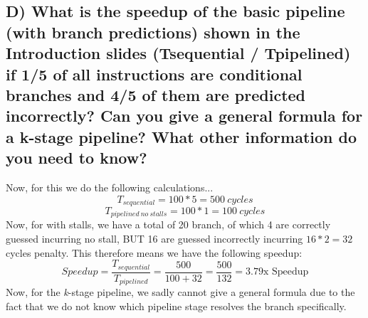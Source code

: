 \documentclass{article}
\begin{document}
\subsection{D) What is the speedup of the basic pipeline (with branch predictions) shown in the Introduction slides (Tsequential / Tpipelined) if 1/5 of all instructions are conditional branches and 4/5 of them are predicted incorrectly? Can you give a general formula for a k-stage pipeline? What other information do you need to know?}
Now, for this we do the following calculations...
$$ T_{sequential} = 100*5 = 500\ cycles $$
$$ T_{pipelined\ no\ stalls} = 100*1 = 100\ cycles $$
Now, for with stalls, we have a total of 20 branch, of which 4 are correctly guessed incurring no stall, BUT 16 are guessed incorrectly incurring $16*2 = 32$ cycles penalty. This therefore means we have the following speedup:
$$ Speedup = \frac{T_{sequential}}{T_{pipelined}} = \frac{500}{100 + 32} = \frac{500}{132} = 3.79\text{x Speedup} $$
Now, for the \textit{k}-stage pipeline, we sadly cannot give a general formula due to the fact that we do not know which pipeline stage resolves the branch specifically.
\end{document}
